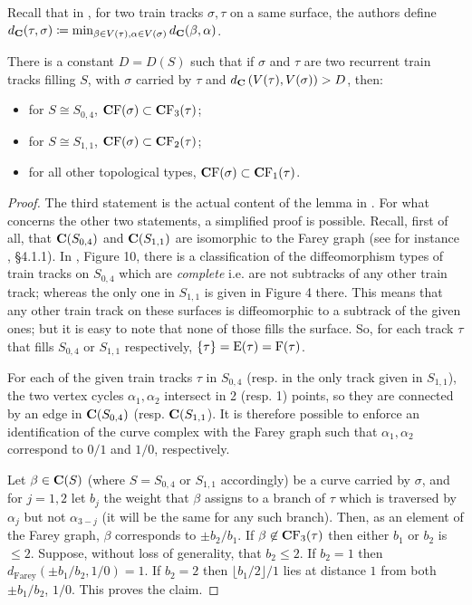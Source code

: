 Recall that in \cite{masurminskyi}, for two train tracks $\sigma,\tau$ on a same surface, the authors define $d_\mathbf C(\tau,\sigma)\coloneqq \min_{\beta\in V(\tau),\alpha\in V(\sigma)} d_\mathbf C(\beta,\alpha)$.
\begin{lemma}
There is a constant $D=D(S)$ such that if $\sigma$ and $\tau$ are two recurrent train tracks filling $S$, with $\sigma$ carried by $\tau$ and $d_\mathbf C\left(V(\tau),V(\sigma)\right)>D$, then:
\begin{itemize}
\item for $S\cong S_{0,4}$, $\mathbf C \mathrm F(\sigma)\subset \mathbf C \mathrm F_3(\tau)$;
\item for $S\cong S_{1,1}$, $\mathbf C \mathrm F(\sigma)\subset \mathbf C \mathrm F_2(\tau)$;
\item for all other topological types, $\mathbf C \mathrm F(\sigma)\subset \mathbf C \mathrm F_1(\tau)$.
\end{itemize}
\end{lemma}
\begin{proof}
The third statement is the actual content of the lemma in \cite{masurminskyi}. For what concerns the other two statements, a simplified proof is possible. Recall, first of all, that $\mathbf C(S_{0,4})$ and $\mathbf C(S_{1,1})$ are isomorphic to the Farey graph (see for instance \cite{farb}, \S 4.1.1). In \cite{ibaraki}, Figure 10, there is a classification of the diffeomorphism types of train tracks on $S_{0,4}$ which are \emph{complete} i.e. are not subtracks of any other train track; whereas the only one in $S_{1,1}$ is given in Figure 4 there. This means that any other train track on these surfaces is diffeomorphic to a subtrack of the given ones; but it is easy to note that none of those fills the surface. So, for each track $\tau$ that fills $S_{0,4}$ or $S_{1,1}$ respectively, $\{\tau\}=\mathrm{E}(\tau)=\mathrm{F}(\tau)$.

For each of the given train tracks $\tau$ in $S_{0,4}$ (resp. in the only track given in $S_{1,1}$), the two vertex cycles $\alpha_1,\alpha_2$ intersect in 2 (resp. 1) points, so they are connected by an edge in $\mathbf C(S_{0,4})$ (resp. $\mathbf C(S_{1,1}$). It is therefore possible to enforce an identification of the curve complex with the Farey graph such that $\alpha_1,\alpha_2$ correspond to $0/1$ and $1/0$, respectively.

Let $\beta\in\mathbf C(S)$ (where $S=S_{0,4}$ or $S_{1,1}$ accordingly) be a curve carried by $\sigma$, and for $j=1,2$ let $b_j$ the weight that $\beta$ assigns to a branch of $\tau$ which is traversed by $\alpha_j$ but not $\alpha_{3-j}$ (it will be the same for any such branch). Then, as an element of the Farey graph, $\beta$ corresponds to $\pm b_2/b_1$. If $\beta\not\in \mathbf C \mathrm F_3(\tau)$ then either $b_1$ or $b_2$ is $\leq 2$. Suppose, without loss of generality, that $b_2\leq 2$. If $b_2=1$ then $d_{\mathrm{Farey}}(\pm b_1/b_2,1/0)=1$. If $b_2=2$ then $\lfloor b_1/2\rfloor/1$ lies at distance $1$ from both $\pm b_1/b_2$, $1/0$. This proves the claim.
\end{proof}

